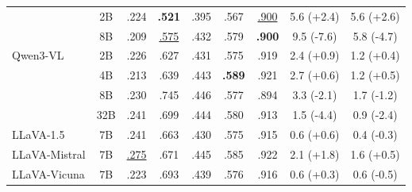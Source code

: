 \begin{table}[t]
\begin{tabular}{>{\raggedright\arraybackslash}p{2.2cm}cccccccc}
 & 2B & \cellcolor[HTML]{F7EBD9}.224 & \cellcolor[HTML]{D9EAF3}\textbf{.521} & \cellcolor[HTML]{D9EAF3}.395 & \cellcolor[HTML]{D9EAF3}.567 & \cellcolor[HTML]{D9EAF3}\underline{.900} & \cellcolor{gray!20}5.6 \textcolor[HTML]{D6610A}{(+2.4)} & \cellcolor{gray!20}5.6 \textcolor[HTML]{D6610A}{(+2.6)} \\
 & 8B & \cellcolor[HTML]{F7EBD9}.209 & \underline{.575} & \cellcolor[HTML]{D9EAF3}.432 & \cellcolor[HTML]{D9EAF3}.579 & \cellcolor[HTML]{D9EAF3}\textbf{.900} & \cellcolor{gray!20}9.5 \textcolor[HTML]{2166AC}{(-7.6)} & \cellcolor{gray!20}5.8 \textcolor[HTML]{2166AC}{(-4.7)} \\
\addlinespace[1pt]
Qwen3-VL & 2B & \cellcolor[HTML]{F7EBD9}.226 & .627 & \cellcolor[HTML]{D9EAF3}.431 & \cellcolor[HTML]{D9EAF3}.575 & \cellcolor[HTML]{D9EAF3}.919 & \cellcolor{gray!20}2.4 \textcolor[HTML]{D6610A}{(+0.9)} & \cellcolor{gray!20}1.2 \textcolor[HTML]{D6610A}{(+0.4)} \\
 & 4B & \cellcolor[HTML]{F7EBD9}.213 & .639 & \cellcolor[HTML]{D9EAF3}.443 & \cellcolor[HTML]{D9EAF3}\textbf{.589} & \cellcolor[HTML]{D9EAF3}.921 & \cellcolor{gray!20}2.7 \textcolor[HTML]{D6610A}{(+0.6)} & \cellcolor{gray!20}1.2 \textcolor[HTML]{D6610A}{(+0.5)} \\
 & 8B & \cellcolor[HTML]{F7EBD9}.230 & .745 & \cellcolor[HTML]{D9EAF3}.446 & \cellcolor[HTML]{D9EAF3}.577 & \cellcolor[HTML]{D9EAF3}.894 & \cellcolor{gray!20}3.3 \textcolor[HTML]{2166AC}{(-2.1)} & \cellcolor{gray!20}1.7 \textcolor[HTML]{2166AC}{(-1.2)} \\
 & 32B & \cellcolor[HTML]{F7EBD9}.241 & .699 & \cellcolor[HTML]{D9EAF3}.444 & \cellcolor[HTML]{D9EAF3}.580 & \cellcolor[HTML]{D9EAF3}.913 & \cellcolor{gray!20}1.5 \textcolor[HTML]{2166AC}{(-4.4)} & \cellcolor{gray!20}0.9 \textcolor[HTML]{2166AC}{(-2.4)} \\
\addlinespace[1pt]
LLaVA-1.5 & 7B & \cellcolor[HTML]{F7EBD9}.241 & .663 & \cellcolor[HTML]{D9EAF3}.430 & \cellcolor[HTML]{D9EAF3}.575 & \cellcolor[HTML]{D9EAF3}.915 & \cellcolor{gray!20}0.6 \textcolor[HTML]{D6610A}{(+0.6)} & \cellcolor{gray!20}0.4 \textcolor[HTML]{2166AC}{(-0.3)} \\
\addlinespace[1pt]
LLaVA-Mistral & 7B & \cellcolor[HTML]{D9EAF3}\underline{.275} & .671 & \cellcolor[HTML]{D9EAF3}.445 & \cellcolor[HTML]{D9EAF3}.585 & \cellcolor[HTML]{D9EAF3}.922 & \cellcolor{gray!20}2.1 \textcolor[HTML]{D6610A}{(+1.8)} & \cellcolor{gray!20}1.6 \textcolor[HTML]{D6610A}{(+0.5)} \\
\addlinespace[1pt]
LLaVA-Vicuna & 7B & \cellcolor[HTML]{F7EBD9}.223 & .693 & \cellcolor[HTML]{D9EAF3}.439 & \cellcolor[HTML]{D9EAF3}.576 & \cellcolor[HTML]{D9EAF3}.916 & \cellcolor{gray!20}0.6 \textcolor[HTML]{D6610A}{(+0.3)} & \cellcolor{gray!20}0.6 \textcolor[HTML]{2166AC}{(-0.5)} \\

\end{tabular}
\end{table}
